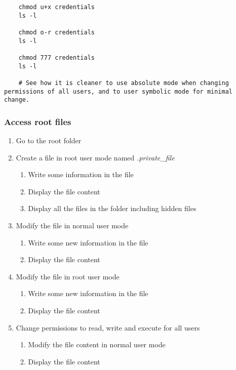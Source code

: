 \ifdefined\answer
\begin{verbatim}
    chmod u+x credentials
    ls -l

    chmod o-r credentials
    ls -l

    chmod 777 credentials
    ls -l

    # See how it is cleaner to use absolute mode when changing permissions of all users, and to user symbolic mode for minimal change.
\end{verbatim}
\fi


\subsubsection{Access root files}

\begin{enumerate}
    \item Go to the root folder
    \item Create a file in root user mode named \textit{.private\_file}
    \begin{enumerate}
        \item Write some information in the file
        \item Display the file content
        \item Display all the files in the folder including hidden files
    \end{enumerate}
    \item Modify the file in normal user mode
    \begin{enumerate}
        \item Write some new information in the file
        \item Display the file content
    \end{enumerate}
    \item Modify the file in root user mode
    \begin{enumerate}
        \item Write some new information in the file
        \item Display the file content
    \end{enumerate}
    \item Change permissions to read, write and execute for all users
    \begin{enumerate}
        \item Modify the file content in normal user mode
        \item Display the file content
    \end{enumerate}
\end{enumerate}

